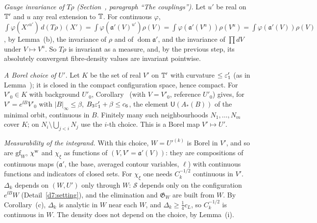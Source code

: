 \begin{detail}
\begin{step}
\end{step}
\begin{step}
\emph{Gauge invariance of $T\rho$ (Section~, paragraph ``The couplings'').} Let $u'$ be real on $\mathbb T'$ and $u$ any real extension to $\mathbb T$. For continuous $\varphi$, $\int\varphi(X'^{u'})\,d(T\rho)(X')=\int\varphi(\mathfrak a'(V)^{u'})\rho(V)=\int\varphi(\mathfrak a'(V^u))\rho(V^u)=\int\varphi(\mathfrak a'(V))\rho(V)$, by Lemma~(b), the invariance of $\rho$ and of $\operatorname{dom}\mathfrak a'$, and the invariance of $\prod dV$ under $V\mapsto V^u$. So $T\rho$ is invariant as a measure, and, by the previous step, its absolutely convergent fibre-density values are invariant pointwise.
\end{step}
\end{detail}

\begin{detail}\label{d7:borel}
\begin{step}
\emph{A Borel choice of $U'$.} Let $K$ be the set of real $V'$ on $\mathbb T'$ with curvature $\le\varepsilon'_1$ (as in Lemma~); it is closed in the compact configuration space, hence compact. For $V'_0\in K$ with background $U'_0$, Corollary~ (with $V=V'_0$, reference $U'_0$) gives, for $V'=e^{\ii B}V'_0$ with $|B|_\infty\le\beta$, $B_3\varepsilon'_1+\beta\le c_6$, the element $\mathsf U(A_*(B))$ of the minimal orbit, continuous in $B$. Finitely many such neighbourhoods $N_1,\dots,N_m$ cover $K$; on $N_i\setminus\bigcup_{j<i}N_j$ use the $i$-th choice. This is a Borel map $V'\mapsto U'$.
\end{step}
\begin{step}
\emph{Measurability of the integrand.} With this choice, $W=U'^{(k)}$ is Borel in $V'$, and so are $\mathrm{gf}_W$, $\chi^{\rm w}$ and $\chi_\xi$ as functions of $(V,V'=\mathfrak a'(V))$: they are compositions of continuous maps ($\mathfrak a'$, the base, averaged contour variables, $\ell$) with continuous functions and indicators of closed sets. For $\chi_\xi$ one needs $C_k^{-1/2}$ continuous in $V'$. $\Delta_k$ depends on $(W,U')$ only through $W$: $\mathcal S$ depends only on the configuration $e^{\ii B}W$ (Detail~\ref{d7:setting}), and the elimination and $\mathfrak G_W$ are built from $W$. By Corollary~(c), $\Delta_k$ is analytic in $W$ near each $W$, and $\Delta_k\ge\frac14c_L$, so $C_k^{-1/2}$ is continuous in $W$. The density does not depend on the choice, by Lemma~(i).
\end{step}
\end{detail}

